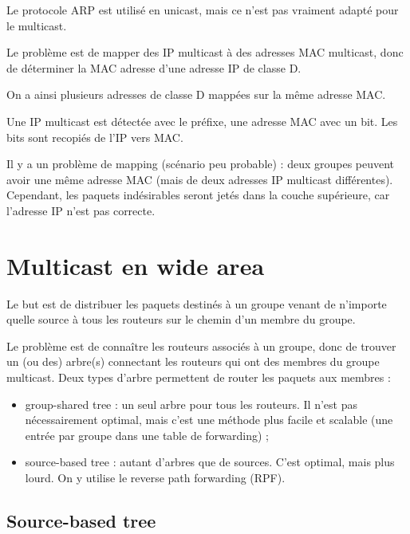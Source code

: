 		Le protocole ARP est utilisé en unicast, mais ce n'est pas vraiment adapté pour le multicast.
		
		Le problème est de mapper des IP multicast à des adresses MAC multicast, donc de déterminer la MAC adresse d'une adresse IP de classe D.
	
		
		On a ainsi plusieurs adresses de classe D mappées sur la même adresse MAC.
	
		Une IP multicast est détectée avec le préfixe, une adresse MAC avec un bit. Les bits sont recopiés de l'IP vers MAC.
	
		Il y a un problème de mapping (scénario peu probable) : deux groupes peuvent avoir une même adresse MAC (mais de deux adresses IP multicast différentes). Cependant, les paquets indésirables seront jetés dans la couche supérieure, car l'adresse IP n'est pas correcte.
	
	\section{Multicast en wide area}
	
	Le but est de distribuer les paquets destinés à un groupe venant de n'importe quelle source à tous les routeurs sur le chemin d'un membre du groupe.
	
	Le problème est de connaître les routeurs associés à un groupe, donc de trouver un (ou des) arbre(s) connectant les routeurs qui ont des membres du groupe multicast. Deux types d'arbre permettent de router les paquets aux membres :
	
	\begin{itemize}
		\item group-shared tree : un seul arbre pour tous les routeurs. Il n'est pas nécessairement optimal, mais c'est une méthode plus facile et scalable (une entrée par groupe dans une table de forwarding) ;
		\item source-based tree : autant d'arbres que de sources. C'est optimal, mais plus lourd. On y utilise le reverse path forwarding (RPF).
	\end{itemize}
	
	
		\subsection{Source-based tree}
		
		
